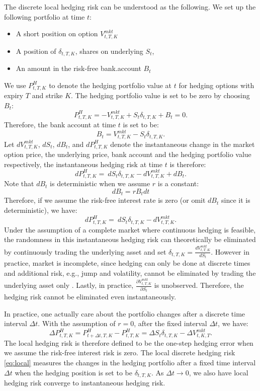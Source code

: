 \documentclass[letterpaper,12pt,titlepage,oneside,final]{book}
\numberwithin{equation}{section}
\theoremstyle{definition}
\newcommand{\DT}{\Delta t}
\newcommand{\Vmkt}{V^{mkt}}
\newcommand{\Smkt}{S}
\begin{document}
The discrete local hedging risk can be understood as the following.
We set up the following portfolio at time $t$:
\begin{itemize}
\item A short position on option $\Vmkt_{t,T,K}$
\item  A position of $\delta_{t,T,K}$, shares on underlying $\Smkt_{t}$,
\item An amount in the risk-free bank.account $B_t$
\end{itemize}

We use $P^{H}_{t,T,K}$ to denote the hedging portfolio value at $t$ for hedging options with expiry $T$ and strike $K$.
The hedging portfolio value is set to be zero by choosing $B_t$:
\[
    P^{H}_{t,T,K}=-\Vmkt_{t,T,K}+\Smkt_{t} \delta_{t,T,K} +B_t=0.
\]
Therefore, the bank account  at time $t$ is set to be: 
\[
    B_t=\Vmkt_{t,T,K}-\Smkt_{t} \delta_{t,T,K}.
\]
Let  $d\Vmkt_{t,T,K}$, $d\Smkt_{t}$, $d B_t$, and $d P^{H}_{t,T,K}$ denote the instantaneous change in the market option price, the underlying price,  bank account and the hedging portfolio value respectively, the instantaneous hedging risk at time $t$ is therefore:
\begin{equation}
    d P^{H}_{t,T,K}=\ d\Smkt_{t} \delta_{t,T,K}-d \Vmkt_{t,T,K}+ d B_t.
\end{equation}
Note that $d B_t$ is deterministic when we assume $r$ is a constant:
\[
    d B_t=r B_{t} dt
\]
Therefore, if we assume the risk-free interest rate is zero (or omit $d B_t$ since it is deterministic), we have:
\begin{equation}\label{eq:HE}
    d P^{H}_{t,T,K}=\ d\Smkt_{t} \delta_{t,T,K}-d \Vmkt_{t,T,K}.
\end{equation}
Under the assumption of a complete market where continuous hedging is feasible, the randomness in this instantaneous hedging risk can theoretically be eliminated by continuously trading the underlying asset and set $\delta_{t,T,K}=\frac{d \Vmkt_{t,T,K}}{d\Smkt_{t}}$. However in practice, market is incomplete, since hedging can only be done at discrete times and additional risk, e.g., jump and volatility, cannot be eliminated by trading the underlying asset only \cite{heston1993closed,gatheral2011volatility}. 
Lastly, in practice, $\frac{\partial \Vmkt_{t,T,K}}{\partial \Smkt_{t}}$ is unobserved.  Therefore, the hedging risk cannot be eliminated even instantaneously. 

In practice, one actually care about the portfolio changes after a discrete time interval $\DT$. With the assumption of $r=0$, after the fixed interval $\DT$,
we have:
\begin{equation}
	\label{eq:localPL}
    \Delta P^{H}_{t,T,K}=P^{H}_{t+\DT,T,K}-P^{H}_{t,T,K}=\Delta \Smkt_{t}\delta_{t,T,K} -\Delta V^{mkt}_{t,K,T}.
\end{equation}
The local hedging risk is therefore defined to be the one-step hedging error when we assume the risk-free interest risk is zero. The local discrete hedging risk \eqref{eq:local} measures  the changes in the hedging portfolio after a fixed time interval $\DT$ when the hedging position is set to be $\delta_{t,T,K}$.  
 As $\DT \rightarrow 0$, we also have local hedging risk converge to instantaneous hedging risk. 
 
\end{document}
